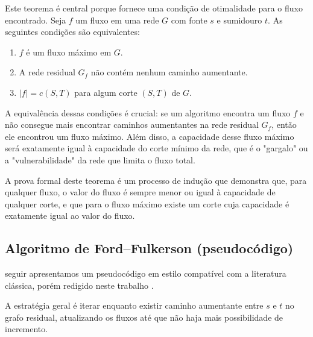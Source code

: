 \documentclass[12pt]{article}
\begin{document}
\noindent Este teorema é central porque fornece uma condição de otimalidade para o fluxo encontrado. Seja $f$ um fluxo em uma rede $G$ com fonte $s$ e sumidouro $t$. As seguintes condições são equivalentes:


\begin{enumerate}
    \item $f$ é um fluxo máximo em $G$.
    \item  A rede residual $G_f$ não contém nenhum caminho aumentante.
    \item $|f| = c(S, T)$ para algum corte $(S, T)$ de $G$.
\end{enumerate}

\noindent A equivalência dessas condições é crucial: se um algoritmo encontra um fluxo $f$ e não consegue mais encontrar caminhos aumentantes na rede residual $G_f$, então ele encontrou um fluxo máximo. Além disso, a capacidade desse fluxo máximo será exatamente igual à capacidade do corte mínimo da rede, que é o "gargalo" ou a "vulnerabilidade" da rede que limita o fluxo total. 

\noindent A prova formal deste teorema é um processo de indução que demonstra que, para qualquer fluxo, o valor do fluxo é sempre menor ou igual à capacidade de qualquer corte, e que para o fluxo máximo existe um corte cuja capacidade é exatamente igual ao valor do fluxo.



\newpage
\subsection{Algoritmo de Ford–Fulkerson (pseudocódigo)} 

 seguir apresentamos um pseudocódigo em estilo compatível com a literatura clássica, porém redigido neste trabalho \cite{cormen2009,ahuja1993,kleinberg2006}. 

A estratégia geral é iterar enquanto existir caminho aumentante entre $s$ e $t$ no grafo residual, atualizando os fluxos até que não haja mais possibilidade de incremento.
\end{document}
